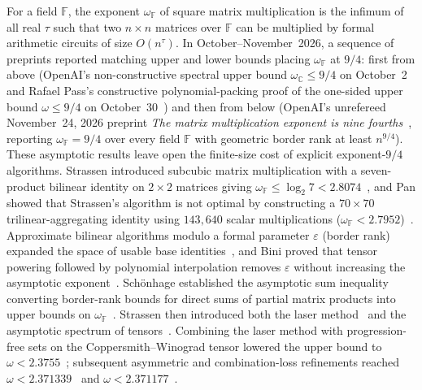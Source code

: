 \documentclass[11pt,a4paper]{article}
\theoremstyle{plain}
\theoremstyle{definition}
\theoremstyle{remark}
\newcommand{\C}{\mathbb{C}}
\newcommand{\F}{\mathbb{F}}
\begin{document}
For a field $\F$, the exponent $\omega_{\F}$ of square matrix multiplication is the infimum of all real $\tau$ such that two $n \times n$ matrices over $\F$ can be multiplied by formal arithmetic circuits of size $O(n^\tau)$. In October--November~2026, a sequence of preprints reported matching upper and lower bounds placing $\omega_{\F}$ at $9/4$: first from above (OpenAI's non-constructive spectral upper bound $\omega_{\C} \le 9/4$ on October~2~\cite{OpenAI2026Upper} and Rafael Pass's constructive polynomial-packing proof of the one-sided upper bound $\omega \le 9/4$ on October~30~\cite{Pass2026}) and then from below (OpenAI's unrefereed November~24, 2026 preprint \emph{The matrix multiplication exponent is nine fourths}~\cite{OpenAI2026Lower}, reporting $\omega_{\F} = 9/4$ over every field $\F$ with geometric border rank at least $n^{9/4}$). These asymptotic results leave open the finite-size cost of explicit exponent-$9/4$ algorithms. Strassen introduced subcubic matrix multiplication with a seven-product bilinear identity on $2 \times 2$ matrices giving $\omega_{\F} \le \log_2 7 < 2.8074$~\cite{Strassen1969}, and Pan showed that Strassen's algorithm is not optimal by constructing a $70 \times 70$ trilinear-aggregating identity using $143{,}640$ scalar multiplications ($\omega_{\F} < 2.7952$)~\cite{Pan1978,Pan2018}. Approximate bilinear algorithms modulo a formal parameter $\varepsilon$ (border rank) expanded the space of usable base identities~\cite{BCRL1979}, and Bini proved that tensor powering followed by polynomial interpolation removes $\varepsilon$ without increasing the asymptotic exponent~\cite{Bini1980}. Sch\"onhage established the asymptotic sum inequality converting border-rank bounds for direct sums of partial matrix products into upper bounds on $\omega_{\F}$~\cite{Schonhage1981}. Strassen then introduced both the laser method~\cite{Strassen1987} and the asymptotic spectrum of tensors~\cite{Strassen1988}. Combining the laser method with progression-free sets on the Coppersmith--Winograd tensor lowered the upper bound to $\omega < 2.3755$~\cite{CW1990}; subsequent asymmetric and combination-loss refinements reached $\omega < 2.371339$~\cite{ADWXXZ2025} and $\omega < 2.371177$~\cite{DEK2026}.
\end{document}
